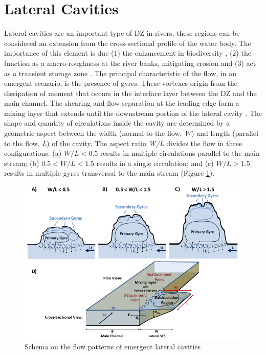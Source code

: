 \section{Lateral Cavities}
Lateral cavities are an important type of DZ in rivers, these regions can be considered an extension from the cross-sectional profile of the water body. The importance of this element is due (1) the enhancement in biodiversity \cite{ribi2014,harvey2016}, (2) the function as a macro-roughness at the river banks, mitigating erosion \cite{juez2018} and (3) act as a transient storage zone \cite{jackson2013,drost2014,jackson2015}. The principal characteristic of the flow, in an emergent scenario, is the presence of gyres. These vortexes origin from the dissipation of moment that occurs in the interface layer between the DZ and the main channel. The shearing and flow separation at the leading edge form a mixing layer that extends until the downstream portion of the lateral cavity \cite{uijttewaal2005,jackson2013}. The shape and quantity of circulations inside the cavity are determined by a geometric aspect between the width (normal to the flow, \textit{W}) and length (parallel to the flow, \textit{L}) of the cavity. The aspect ratio \textit{W/L} divides the flow in three configurations: (a) $W/L<0.5$ results in multiple circulations parallel to the main stream; (b) $0.5<W/L<1.5$ results in a single circulation; and (c) $W/L>1.5$ results in multiple gyres transversal to the main stream \cite{weitbrecht2001,jackson2013,sukhodolov2014}(Figure \ref{fig:lCavitySchema}).

\begin{figure}[!ht]
\centering
\includegraphics[width=0.9\linewidth]{../images/introduction/lateralCavitySchema.png}
\caption{Schema on the flow patterns of emergent lateral cavities \cite{jackson2013}}
\label{fig:lCavitySchema}
\end{figure}

